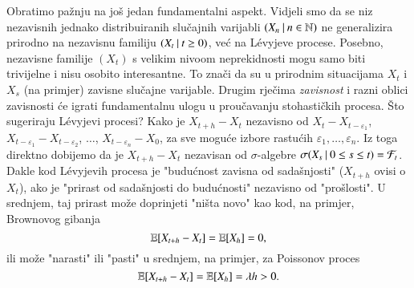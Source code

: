 \begin{nap} \label{nap:21.16}
    Obratimo pa\v znju na jo\v s jedan fundamentalni aspekt.
    Vidjeli smo da se niz nezavisnih jednako distribuiranih slu\v cajnih varijabli $({X_n} \: | \: {n \in \mathbb{N}})$ ne generalizira prirodno na nezavisnu familiju $({X_t} \: | \: {t \geq 0})$, ve\' c na L\' evyjeve procese.
    Posebno,
    nezavisne familije $(X_t)$ s velikim nivoom neprekidnosti mogu samo biti trivijelne i nisu osobito interesantne.
    To zna\v ci da su u prirodnim situacijama $X_t$ i $X_s$ (na primjer) zavisne slu\v cajne varijable.
    Drugim rje\v cima \emph{zavisnost} i razni oblici zavisnosti \' ce igrati fundamentalnu ulogu u prou\v cavanju stohasti\v ckih procesa.
    \v Sto sugeriraju L\' evyjevi procesi?
    Kako je $X_{t + h} - X_t$ nezavisno od $X_t - X_{t - \varepsilon_1}$, $X_{t - \varepsilon_1} - X_{t - \varepsilon_2}$, $\ldots$, $X_{t - \varepsilon_n} - X_0$, za sve mogu\' ce izbore rastu\' cih $\varepsilon_1, \ldots, \varepsilon_n$.
    Iz toga direktno dobijemo da je $X_{t + h} - X_t$ nezavisan od $\sigma$-algebre $\sigma({X_s} \: | \: {0 \leq s \leq t}) = \mathcal{F}_t$.
    Dakle kod L\' evyjevih procesa je "budu\' cnost zavisna od sada\v snjosti" ($X_{t + h}$ ovisi o $X_t$), ako je "prirast od sada\v snjosti do budu\' cnosti" nezavisno od "pro\v slosti".
    U srednjem, taj prirast mo\v ze doprinjeti "ni\v sta novo" kao kod, na primjer, Brownovog gibanja
    \begin{equation*}
        \mathbb{E} [X_{t + h} - X_t] = \mathbb{E} [X_h] = 0,
    \end{equation*}
    ili mo\v ze "narasti" ili "pasti" u srednjem, na primjer, za Poissonov proces
    \begin{equation*}
        \mathbb{E} [X_{t + h} - X_t] = \mathbb{E} [X_h] = \lambda h > 0.
    \end{equation*}
\end{nap}
